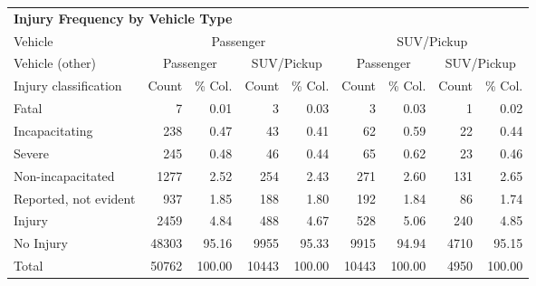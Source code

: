 
\begin{tabular}{lrrrrrrrr}
\toprule
\multicolumn{9}{l}{\normalsize\textbf{Injury Frequency by Vehicle Type}}\\\addlinespace
Vehicle & \multicolumn{4}{c}{Passenger} & \multicolumn{4}{c}{SUV/Pickup} \\
\cmidrule(lr){2-5}
\cmidrule(l){6-9}
Vehicle (other) & \multicolumn{2}{c}{Passenger} & \multicolumn{2}{c}{SUV/Pickup} & \multicolumn{2}{c}{Passenger} & \multicolumn{2}{c}{SUV/Pickup} \\
\cmidrule(lr){2-3}
\cmidrule(lr){4-5}
\cmidrule(lr){6-7}
\cmidrule(l){8-9}
Injury classification     &      Count  &  \% Col.  &       Count  &  \% Col.  &       Count  &  \% Col.  &       Count  &  \% Col. \\
\midrule
Fatal                    &         7 &     0.01 &          3 &     0.03 &          3 &     0.03 &          1 &     0.02 \\
Incapacitating    &       238 &     0.47 &         43 &     0.41 &         62 &     0.59 &         22 &     0.44 \\\addlinespace
Severe            &       245 &     0.48 &         46 &     0.44 &         65 &     0.62 &         23 &     0.46 \\\addlinespace
Non-incapacitated &      1277 &     2.52 &        254 &     2.43 &        271 &     2.60 &        131 &     2.65 \\
Reported, not evident   &       937 &     1.85 &        188 &     1.80 &        192 &     1.84 &         86 &     1.74 \\\addlinespace
Injury             &      2459 &     4.84 &        488 &     4.67 &        528 &     5.06 &        240 &     4.85 \\\addlinespace
No Injury  &     48303 &    95.16 &       9955 &    95.33 &       9915 &    94.94 &       4710 &    95.15 \\\addlinespace
Total                    &     50762 &   100.00 &      10443 &   100.00 &      10443 &   100.00 &       4950 &   100.00 \\
\bottomrule
\end{tabular}